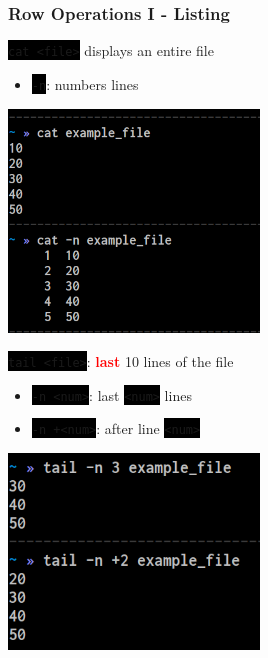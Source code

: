 \documentclass[unknownkeysallowed, 10pt, a4 paper, handout]{beamer}
\newcommand{\focus}[1]{\textbf{\textcolor{red}{#1}}}
\newcommand{\code}[1]{\colorbox{black}{\color{green}\texttt{#1}}}
\newcommand{\sidebyside}[5]{
  \begin{minipage}{#1\textwidth}
    #2
  \end{minipage} #3 \begin{minipage}{#4\textwidth}
    #5
  \end{minipage}
}
\begin{document}
\begin{frame}
  \begin{center}
    \frametitle{Row Operations I - Listing}

    \sidebyside{0.53}{
      \code{cat <file>} displays an entire file
      \begin{itemize}
        \item \code{-n}: numbers lines
      \end{itemize}
    }{\hfill}{0.44}{
      \begin{center}
        \includegraphics[width=0.50\textwidth]{pics/cat.png}
      \end{center}
    }

    \sidebyside{0.53}{
      \code{tail <file>}: \focus{last} 10 lines of the file
      \vspace{-4mm}
        \begin{itemize}
          \item \code{-n <num>}: last \code{<num>} lines
          \item \code{-n +<num>}: after line \code{<num>}
        \end{itemize}
      }{\hfill}{0.44}{
        \begin{center}
          \includegraphics[width=0.50\textwidth]{pics/tail.png}
        \end{center}
      }


\end{center}
\end{frame}
\end{document}
